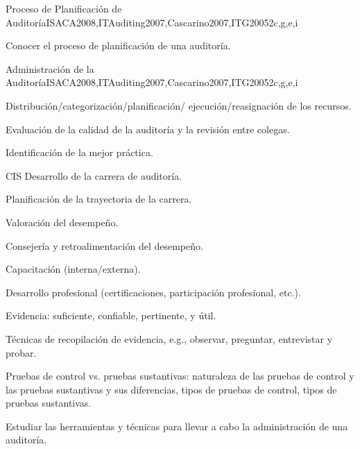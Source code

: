\begin{syllabus}
\begin{unit}{Proceso de Planificación de Auditoría}{}{ISACA2008,ITAuditing2007,Cascarino2007,ITG2005}{2}{c,g,e,i}
	\begin{learningoutcomes}
	\item Conocer el proceso de planificación de una auditoría.
	\end{learningoutcomes}
	\end{unit}
	
	\begin{unit}{Administración de la Auditoría}{}{ISACA2008,ITAuditing2007,Cascarino2007,ITG2005}{2}{c,g,e,i}
	\begin{topics}
	\item Distribución/categorización/planificación/ ejecución/reasignación de los recursos.
	\item Evaluación de la calidad de la auditoría y la revisión entre colegas.
	\item Identificación de la mejor práctica.
	\item CIS Desarrollo de la carrera de auditoría.
	\item Planificación de la trayectoria de la carrera.
	\item Valoración del desempeño.
	\item Consejería y retroalimentación del desempeño.
	\item Capacitación (interna/externa).
	\item Desarrollo profesional (certificaciones, participación profesional, etc.).
	\item Evidencia: suficiente, confiable, pertinente, y útil.
	\item Técnicas de recopilación de evidencia, e.g., observar, preguntar, entrevistar y probar.
	\item Pruebas de control vs. pruebas sustantivas: naturaleza de las pruebas de control y las pruebas sustantivas y sus diferencias, tipos de pruebas de control, tipos de pruebas sustantivas.
	\end{topics}
	\begin{learningoutcomes}
	\item Estudiar las herramientas y técnicas para llevar a cabo la administración de una auditoría.
	\end{learningoutcomes}
	\end{unit}
	

\end{syllabus}
